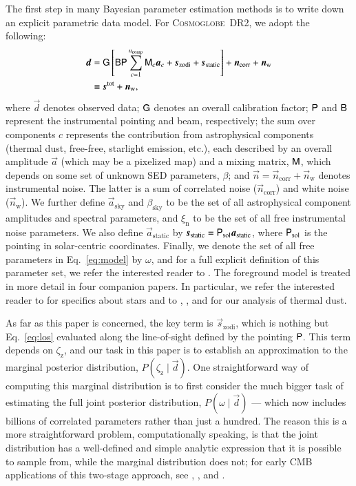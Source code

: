 \documentclass[twocolumn]{aa}
\newcommand{\dv}[0]{\vec{d}}
\newcommand{\B}[0]{\tens{B}}
\newcommand{\G}[0]{\tens{G}}
\newcommand{\n}[0]{\vec{n}}
\newcommand{\s}[0]{\vec{s}}
\renewcommand{\a}[0]{\vec{a}}
\newcommand{\M}[0]{\tens{M}}
\renewcommand{\P}[0]{\tens{P}}
\newcommand{\cosmoglobe}{\textsc{Cosmoglobe}}
\begin{document}
The first step in many Bayesian parameter estimation methods is to
write down an explicit parametric data model. For \cosmoglobe\ DR2, we
adopt the following:
\begin{align}
	\label{eq:model}
	\dv &=\G\left[\B\P\sum_{c=1}^{n_{\mathrm{comp}}}\M_c\a_c+\s_{\mathrm{zodi}} +
          \s_{\mathrm{static}}\right] + \n_\mathrm{corr} + \n_\mathrm{w} \nonumber\\
        &\equiv \s^{\mathrm{tot}} + \n_\mathrm{w},
\end{align}
where $\dv$ denotes observed data; $\G$ denotes an overall calibration
factor; $\P$ and $\B$ represent the instrumental pointing and beam,
respectively; the sum over components $c$ represents the contribution
from astrophysical components (thermal dust, free-free, starlight
emission, etc.), each described by an overall amplitude $\a$ (which may be a
pixelized map) and a mixing matrix, $\M$, which depends on some set of
unknown SED parameters, $\beta$; and $\n=\n_\mathrm{corr} + \n_\mathrm{w}$ denotes instrumental
noise. The latter is a sum of correlated noise ($\n_\mathrm{corr}$) and white noise ($\n_\mathrm{w}$). 
We further define $\a_{\mathrm{sky}}$ and
$\beta_{\mathrm{sky}}$ to be the set of all astrophysical component
amplitudes and spectral parameters, and $\xi_{\mathrm{n}}$ to be the
set of all free instrumental noise parameters. We also define
$\a_{\mathrm{static}}$ by
$\s_{\mathrm{static}}=\P_{\mathrm{sol}}\a_{\mathrm{static}}$, where
$\P_{\mathrm{sol}}$ is the pointing in solar-centric
coordinates. Finally, we denote the set of all free parameters in
Eq.~\eqref{eq:model} by $\omega$, and for a full explicit definition
of this parameter set, we refer the interested reader to
\citet{CG02_01}. The foreground model is treated in more 
detail in four companion papers. In particular, we refer the interested reader 
to \citet{CG02_04} for specifics about stars and to \citet{CG02_05}, \citet{CG02_06}, and \citet{CG02_07} 
for our analysis of thermal dust.

As far as this paper is concerned, the key term is
$\s_{\mathrm{zodi}}$, which is nothing but Eq.~\eqref{eq:los}
evaluated along the line-of-sight defined by the pointing $\P$. This
term depends on $\zeta_{\mathrm{z}}$, and our task in this paper is to
establish an approximation to the marginal posterior distribution,
$P(\zeta_{\mathrm{z}} \mid\dv)$. One straightforward way of computing this
marginal distribution is to first
consider the much bigger task of estimating the full joint posterior
distribution, $P(\omega \mid\dv)$ --- which now includes billions of
correlated parameters rather than just a hundred. The reason this is a 
more straightforward problem, computationally speaking, is that 
the joint distribution has a well-defined and simple analytic expression that it
is possible to sample from, while the marginal distribution does not;
for early CMB applications of this two-stage approach, see
\citet{jewell2004}, \citet{wandelt2004}, and \citet{eriksen:2004}.
\end{document}
